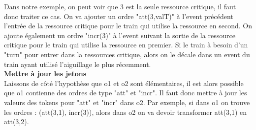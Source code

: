 \documentclass[runningheads]{llncs}
\newcommand{\tuple}[1]{\ensuremath{\langle #1\rangle}}
\begin{document}
%		
%
%
\noindent
Dans notre exemple, on peut voir que 3 est la seule ressource critique, il faut donc traiter ce cas.
On va ajouter un ordre "att(3,valT)" à l'event précédent l'entrée de la ressource critique pour le train qui utilise la ressource en second.
On ajoute également un ordre "incr(3)" à l'event suivant la sortie de la ressource critique pour le train qui utilise la ressource en premier.
Si le train à besoin d'un "turn" pour entrer dans la ressources critique, alors on le décale dans un event du train ayant utilisé l'aiguillage le plus récemment.
\\\textbf{Mettre à jour les jetons}\\
Laissons de côté l'hypothèse que o1 et o2 sont élémentaires, il est alors possible que o1 contienne des ordres de type "att" et "incr". Il faut donc mettre à jour les valeurs
des tokens pour "att" et "incr" dans o2. Par exemple, si dans o1 on trouve les ordres : (att(3,1), incr(3)), alors dans o2 on va devoir transformer att(3,1) en att(3,2).
\end{document}
